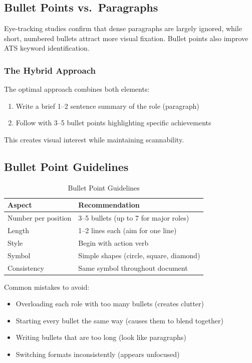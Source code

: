 \documentclass[11pt,a4paper]{article}
\begin{document}
\subsection{Bullet Points vs.\ Paragraphs}

\begin{keystat}
Eye-tracking studies confirm that dense paragraphs are largely ignored, while short, numbered bullets attract more visual fixation. Bullet points also improve ATS keyword identification.
\end{keystat}

\subsubsection{The Hybrid Approach}

The optimal approach combines both elements:

\begin{enumerate}
    \item Write a brief 1--2 sentence summary of the role (paragraph)
    \item Follow with 3--5 bullet points highlighting specific achievements
\end{enumerate}

This creates visual interest while maintaining scannability.

\subsection{Bullet Point Guidelines}

\begin{table}[h]
\centering
\begin{tabular}{@{}ll@{}}
\toprule
\textbf{Aspect} & \textbf{Recommendation} \\
\midrule
Number per position & 3--5 bullets (up to 7 for major roles) \\
Length & 1--2 lines each (aim for one line) \\
Style & Begin with action verb \\
Symbol & Simple shapes (circle, square, diamond) \\
Consistency & Same symbol throughout document \\
\bottomrule
\end{tabular}
\caption{Bullet Point Guidelines}
\end{table}

\begin{warning}
Common mistakes to avoid:
\begin{itemize}[noitemsep]
    \item Overloading each role with too many bullets (creates clutter)
    \item Starting every bullet the same way (causes them to blend together)
    \item Writing bullets that are too long (look like paragraphs)
    \item Switching formats inconsistently (appears unfocused)
\end{itemize}
\end{warning}
\end{document}
